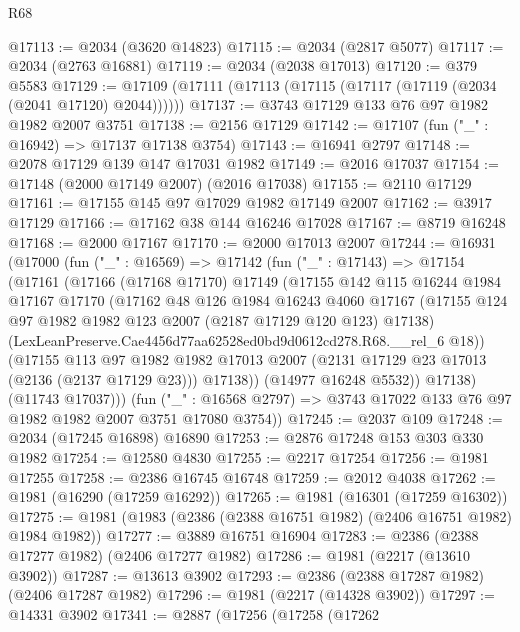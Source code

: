 \begin{lexlean}{R68}
\begin{coremodule}
@17113 := @2034 (@3620 @14823)
@17115 := @2034 (@2817 @5077)
@17117 := @2034 (@2763 @16881)
@17119 := @2034 (@2038 @17013)
@17120 := @379 @5583
@17129 := @17109 (@17111 (@17113 (@17115 (@17117 (@17119 (@2034 (@2041 @17120) @2044))))))
@17137 := @3743 @17129 @133 @76 @97 @1982 @1982 @2007 @3751
@17138 := @2156 @17129
@17142 := @17107 (fun ("_" : @16942) => @17137 @17138 @3754)
@17143 := @16941 @2797
@17148 := @2078 @17129 @139 @147 @17031 @1982
@17149 := @2016 @17037
@17154 := @17148 (@2000 @17149 @2007) (@2016 @17038)
@17155 := @2110 @17129
@17161 := @17155 @145 @97 @17029 @1982 @17149 @2007
@17162 := @3917 @17129
@17166 := @17162 @38 @144 @16246 @17028
@17167 := @8719 @16248
@17168 := @2000 @17167
@17170 := @2000 @17013 @2007
@17244 := @16931
    (@17000
      (fun ("_" : @16569) =>
      @17142
        (fun ("_" : @17143) =>
        @17154
          (@17161
            (@17166
              (@17168 @17170)
              @17149
              (@17155
                @142
                @115
                @16244
                @1984
                @17167
                @17170
                (@17162
                  @48
                  @126
                  @1984
                  @16243
                  @4060
                  @17167
                  (@17155 @124 @97 @1982 @1982 @123 @2007 (@2187 @17129 @120 @123) @17138)
                  (LexLeanPreserve.Cae4456d77aa62528ed0bd9d0612cd278.R68.__rel_6 @18))
                (@17155
                  @113
                  @97
                  @1982
                  @1982
                  @17013
                  @2007
                  (@2131 @17129 @23 @17013 (@2136 (@2137 @17129 @23)))
                  @17138))
              (@14977 @16248 @5532))
            @17138)
          (@11743 @17037)))
      (fun ("_" : @16568 @2797) => @3743 @17022 @133 @76 @97 @1982 @1982 @2007 @3751 @17080 @3754))
@17245 := @2037 @109
@17248 := @2034 (@17245 @16898) @16890
@17253 := @2876 @17248 @153 @303 @330 @1982
@17254 := @12580 @4830
@17255 := @2217 @17254
@17256 := @1981 @17255
@17258 := @2386 @16745 @16748
@17259 := @2012 @4038
@17262 := @1981 (@16290 (@17259 @16292))
@17265 := @1981 (@16301 (@17259 @16302))
@17275 := @1981 (@1983 (@2386 (@2388 @16751 @1982) (@2406 @16751 @1982) @1984 @1982))
@17277 := @3889 @16751 @16904
@17283 := @2386 (@2388 @17277 @1982) (@2406 @17277 @1982)
@17286 := @1981 (@2217 (@13610 @3902))
@17287 := @13613 @3902
@17293 := @2386 (@2388 @17287 @1982) (@2406 @17287 @1982)
@17296 := @1981 (@2217 (@14328 @3902))
@17297 := @14331 @3902
@17341 := @2887
    (@17256
      (@17258
        (@17262

\end{coremodule}
\end{lexlean}

